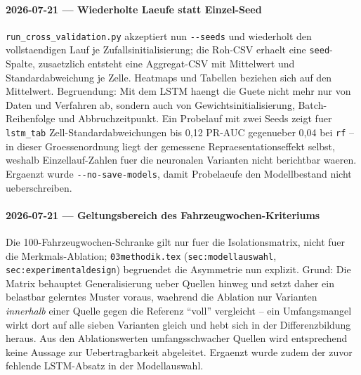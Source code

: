 \paragraph{2026-07-21 --- Wiederholte Laeufe statt Einzel-Seed}
\texttt{run\_cross\_validation.py} akzeptiert nun \texttt{-{}-seeds} und
wiederholt den vollstaendigen Lauf je Zufallsinitialisierung; die Roh-CSV
erhaelt eine \texttt{seed}-Spalte, zusaetzlich entsteht eine
Aggregat-CSV mit Mittelwert und Standardabweichung je Zelle. Heatmaps und
Tabellen beziehen sich auf den Mittelwert. Begruendung: Mit dem LSTM haengt
die Guete nicht mehr nur von Daten und Verfahren ab, sondern auch von
Gewichtsinitialisierung, Batch-Reihenfolge und Abbruchzeitpunkt. Ein
Probelauf mit zwei Seeds zeigt fuer \texttt{lstm\_tab} Zell-Standard\-abweichungen
bis 0{,}12 PR-AUC gegenueber 0{,}04 bei \texttt{rf} -- in dieser
Groessenordnung liegt der gemessene Repraesentationseffekt selbst, weshalb
Einzellauf-Zahlen fuer die neuronalen Varianten nicht berichtbar waeren.
Ergaenzt wurde \texttt{-{}-no-save-models}, damit Probelaeufe den
Modellbestand nicht ueberschreiben.

\paragraph{2026-07-21 --- Geltungsbereich des Fahrzeugwochen-Kriteriums}
Die 100-Fahrzeugwochen-Schranke gilt nur fuer die Isolationsmatrix, nicht fuer
die Merkmals-Ablation; \texttt{03methodik.tex} (\texttt{sec:modellauswahl},
\texttt{sec:experimentaldesign}) begruendet die Asymmetrie nun explizit. Grund:
Die Matrix behauptet Generalisierung ueber Quellen hinweg und setzt daher ein
belastbar gelerntes Muster voraus, waehrend die Ablation nur Varianten
\emph{innerhalb} einer Quelle gegen die Referenz \enquote{voll} vergleicht --
ein Umfangsmangel wirkt dort auf alle sieben Varianten gleich und hebt sich in
der Differenzbildung heraus. Aus den Ablationswerten umfangsschwacher Quellen
wird entsprechend keine Aussage zur Uebertragbarkeit abgeleitet. Ergaenzt wurde
zudem der zuvor fehlende LSTM-Absatz in der Modellauswahl.

